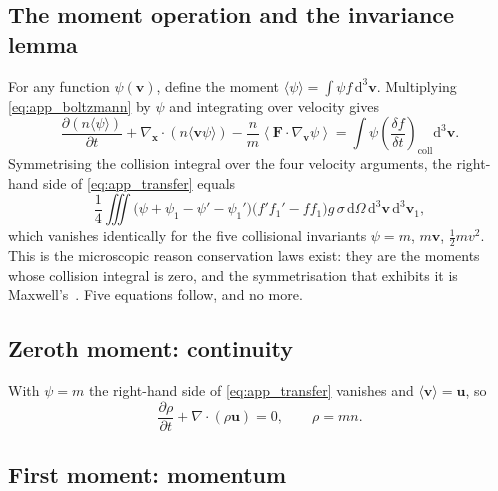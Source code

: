 \subsection{The moment operation and the invariance lemma}

For any function $\psi(\mathbf{v})$, define the moment $\langle\psi\rangle = \int \psi f\,\mathrm{d}^3\mathbf{v}$. Multiplying \eqref{eq:app_boltzmann} by $\psi$ and integrating over velocity gives
\begin{equation}
    \frac{\partial (n\langle\psi\rangle)}{\partial t} + \nabla_{\mathbf{x}}\cdot\left(n\langle \mathbf{v}\psi\rangle\right) - \frac{n}{m}\left\langle \mathbf{F}\cdot\nabla_{\mathbf{v}}\psi\right\rangle
    = \int \psi \left(\frac{\delta f}{\delta t}\right)_{\mathrm{coll}}\mathrm{d}^3\mathbf{v} .
    \label{eq:app_transfer}
\end{equation}
Symmetrising the collision integral over the four velocity arguments, the right-hand side of \eqref{eq:app_transfer} equals
\begin{equation}
    \frac{1}{4}\iiint \bigl(\psi + \psi_1 - \psi' - \psi_1'\bigr)\bigl(f'f_1' - ff_1\bigr)g\,\sigma\,\mathrm{d}\Omega\,\mathrm{d}^3\mathbf{v}\,\mathrm{d}^3\mathbf{v}_1 ,
    \label{eq:app_symmetrised}
\end{equation}
which vanishes identically for the five collisional invariants $\psi = m$, $m\mathbf{v}$, $\tfrac12 m v^2$. This is the microscopic reason conservation laws exist: they are the moments whose collision integral is zero, and the symmetrisation that exhibits it is Maxwell's~\cite{chapman1970kinetic}. Five equations follow, and no more.

\subsection{Zeroth moment: continuity}

With $\psi = m$ the right-hand side of \eqref{eq:app_transfer} vanishes and $\langle \mathbf{v}\rangle = \mathbf{u}$, so
\begin{equation}
    \frac{\partial \rho}{\partial t} + \nabla\cdot(\rho\mathbf{u}) = 0 ,
    \qquad \rho = mn .
    \label{eq:app_continuity}
\end{equation}

\subsection{First moment: momentum}

